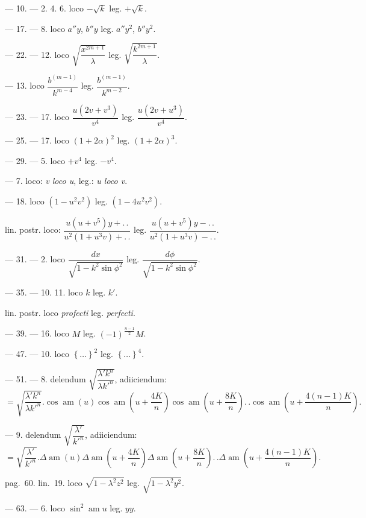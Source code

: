 \documentclass{article}
\begin{document}
--- 10. --- 2. 4. 6. loco $-\sqrt{k}$ leg. $+\sqrt{k}$.

--- 17. --- 8. loco $a''y$, $b''y$ leg. $a''y^{2}$, $b''y^{2}$.

--- 22. --- 12. loco $\sqrt{\dfrac{x^{2m+1}}{\lambda}}$ leg. $\sqrt{\dfrac{k^{2m+1}}{\lambda}}$.

--- 13. loco $\dfrac{b^{(m-1)}}{k^{m-4}}$ leg. $\dfrac{b^{(m-1)}}{k^{m-2}}$.

--- 23. --- 17. loco $\dfrac{u(2v+v^{3})}{v^{4}}$ leg. $\dfrac{u(2v+u^{3})}{v^{4}}$.

--- 25. --- 17. loco $(1+2\alpha)^{2}$ leg. $(1+2\alpha)^{3}$.

--- 29. --- 5. loco $+v^{4}$ leg. $-v^{4}$.

--- 7. loco: \emph{v loco u}, leg.: \emph{u loco v}.

--- 18. loco $(1-u^{2}v^{2})$ leg. $(1-4u^{2}v^{2})$.

lin. postr. loco: $\dfrac{u(u+v^{5})y+.\,.}{u^{2}(1+u^{3}v)+.\,.}$ leg. $\dfrac{u(u+v^{5})y-.\,.}{u^{2}(1+u^{3}v)-.\,.}$.

--- 31. --- 2. loco $\dfrac{dx}{\sqrt{1-k^{2}\sin\phi^{2}}}$ leg. $\dfrac{d\phi}{\sqrt{1-k^{2}\sin\phi^{2}}}$.

--- 35. --- 10. 11. loco $k$ leg. $k'$.

lin. postr. loco \emph{profecti} leg. \emph{perfecti}.

--- 39. --- 16. loco $M$ leg. $(-1)^{\frac{n-1}{2}}M$.

--- 47. --- 10. loco $\left\{\ldots\right\}^{2}$ leg. $\left\{\ldots\right\}^{4}$.

--- 51. --- 8. delendum $\sqrt{\dfrac{\lambda'k^{n}}{\lambda k'^{n}}}$, adiiciendum:
\[
=\sqrt{\frac{\lambda'k^{n}}{\lambda k'^{n}}}.\cos\operatorname{am}(u)\cos\operatorname{am}\left(u+\frac{4K}{n}\right)\cos\operatorname{am}\left(u+\frac{8K}{n}\right).\,.\cos\operatorname{am}\left(u+\frac{4(n-1)K}{n}\right).
\]

--- 9. delendum $\sqrt{\dfrac{\lambda'}{k'^{n}}}$, adiiciendum:
\[
=\sqrt{\frac{\lambda'}{k'^{n}}}.\Delta\operatorname{am}(u)\Delta\operatorname{am}\left(u+\frac{4K}{n}\right)\Delta\operatorname{am}\left(u+\frac{8K}{n}\right).\,.\Delta\operatorname{am}\left(u+\frac{4(n-1)K}{n}\right).
\]


pag.\ 60. lin.\ 19. loco $\sqrt{1-\lambda^{2}z^{2}}$ leg. $\sqrt{1-\lambda^{2}y^{2}}$.

--- 63. --- 6. loco $\sin^{2}\operatorname{am}u$ leg. $yy$.
\end{document}
